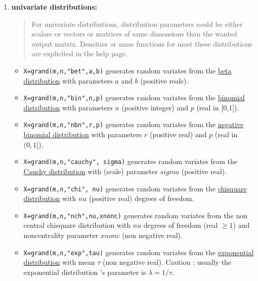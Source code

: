 \begin{enumerate}
\item {\bf univariate distributions:} 

\begin{quote}
    For univariate distributions, distribution parameters could be either scalars or vectors or
    matrices of same dimensions than the wanted output matrix. Densities or mass functions for most 
    these distributions are explicited in the  help page.
\end{quote}

\begin{itemize}
\item {} \verb!X=grand(m,n,"bet",a,b)! generates random variates from 
  the \hyperlink{betapdf}{beta distribution} with parameters $a$ and $b$ (positive reals).

\item {} 
  \verb!X=grand(m,n,"bin",n,p)!  generates random variates from the \hyperlink{binpdf}{binomial 
  distribution} with parameters $n$ (positive integer) and $p$
  (real in [0,1]).

\item {} 
  \verb!X=grand(m,n,"nbn",r,p)! generates random variates from the \hyperlink{nbnpdf}{negative binomial 
  distribution} with parameters $r$ (positive real) and $p$ (real 
  in $(0,1]$).
  
\item {} 
  \verb!X=grand(m,n,"cauchy", sigma)! generates random variates from the  \hyperlink{caupdf}{Cauchy distribution} 
  with (scale) parameter $sigma$ (positive real).
  
\item {} 
  \verb!X=grand(m,n,"chi", nu)! generates random variates from the  \hyperlink{chipdf}{chisquare distribution} 
  with $nu$ (positive real) degrees of freedom. 
  
\item {} 
  \verb!X=grand(m,n,"nch",nu,xnonc)! generates random variates from the non central chisquare
  distribution with $nu$ degrees of freedom (real $\ge 1$) and
  noncentrality parameter $xnonc$ (non negative real).
  
\item {} \verb!X=grand(m,n,"exp",tau)! generates random variates from the  \hyperlink{exppdf}{exponential
  distribution} with mean $\tau$ (non negative real). Caution : usually
  the exponential distribution 's parameter is $\lambda= 1/\tau$.  
  

\end{itemize}
\end{enumerate}
